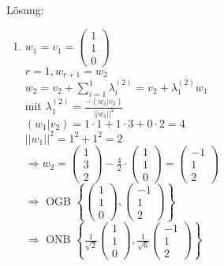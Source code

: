 Lösung:
\begin{enumerate}
\item
$w_1=v_1=\begin{pmatrix}1 \\ 1 \\ 0\end{pmatrix}$\\
$r=1, w_{r+1}=w_2$\\
$w_2=v_2+\sum_{i=1}^1 \lambda_i^{(2)} = v_2+\lambda_1^{(2)}w_1$\\
mit $\lambda_1^{(2)} = \frac{-(w_1|v_2)}{||w_1||^2}$\\
$(w_1|v_2)=1\cdot 1+1\cdot 3+0\cdot 2=4$\\
$||w_1||^2=1^2+1^2=2$\\
$\Rightarrow w_2=\begin{pmatrix}1 \\ 3 \\ 2\end{pmatrix}-\frac{4}{2}\cdot \begin{pmatrix}1 \\ 1 \\ 0\end{pmatrix}=\begin{pmatrix}-1 \\ 1 \\ 2\end{pmatrix}$\\
$\Rightarrow$ OGB $\left\lbrace \begin{pmatrix}1 \\ 1 \\ 0\end{pmatrix},\begin{pmatrix}-1 \\ 1 \\ 2\end{pmatrix}\right\rbrace$\\
$\Rightarrow$ ONB $\left\lbrace \frac{1}{\sqrt{2}}\begin{pmatrix}1 \\ 1 \\ 0\end{pmatrix}, \frac{1}{\sqrt{6}}\begin{pmatrix}-1 \\ 1 \\ 2\end{pmatrix}\right\rbrace$


\end{enumerate}

